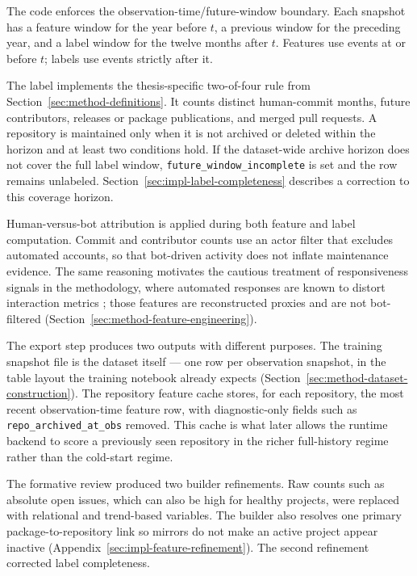 The code enforces the observation-time/future-window boundary. Each snapshot has
a feature window for the year before \(t\), a previous window for the preceding
year, and a label window for the twelve months after \(t\). Features use events
at or before \(t\); labels use events strictly after it.

The label implements the thesis-specific two-of-four rule from
Section~\ref{sec:method-definitions}. It counts distinct human-commit months,
future contributors, releases or package publications, and merged pull requests.
A repository is maintained only when it is not archived or deleted within the
horizon and at least two conditions hold. If the dataset-wide archive horizon
does not cover the full label window, \texttt{future\_window\_incomplete} is set
and the row remains unlabeled. Section~\ref{sec:impl-label-completeness}
describes a correction to this coverage horizon.

Human-versus-bot attribution is applied during both feature and label computation. Commit and contributor counts use an actor filter that excludes automated accounts, so that bot-driven activity does not inflate maintenance evidence. The same reasoning motivates the cautious treatment of responsiveness signals in the methodology, where automated responses are known to distort interaction metrics \cite{hasan2023firstresponse}; those features are reconstructed proxies and are not bot-filtered (Section~\ref{sec:method-feature-engineering}).

The export step produces two outputs with different purposes. The training snapshot file is the dataset itself --- one row per observation snapshot, in the table layout the training notebook already expects (Section~\ref{sec:method-dataset-construction}). The repository feature cache stores, for each repository, the most recent observation-time feature row, with diagnostic-only fields such as \texttt{repo\_archived\_at\_obs} removed. This cache is what later allows the runtime backend to score a previously seen repository in the richer full-history regime rather than the cold-start regime.

The formative review produced two builder refinements. Raw counts such as
absolute open issues, which can also be high for healthy projects, were replaced
with relational and trend-based variables. The builder also resolves one primary
package-to-repository link so mirrors do not make an active project appear
inactive (Appendix~\ref{sec:impl-feature-refinement}). The second refinement
corrected label completeness.

